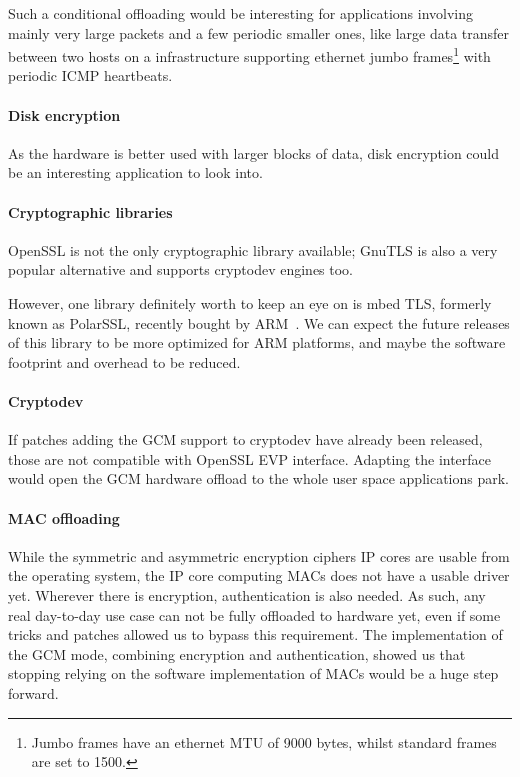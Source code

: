 Such a conditional offloading would be interesting for applications involving mainly very large packets and a few periodic smaller ones, like large data transfer between two hosts on a infrastructure supporting ethernet jumbo frames\footnote{Jumbo frames have an ethernet MTU of 9000 bytes, whilst standard frames are set to 1500.} with periodic ICMP heartbeats.

\paragraph{Disk encryption}
As the hardware is better used with larger blocks of data, disk encryption could be an interesting application to look into.

\paragraph{Cryptographic libraries}
OpenSSL is not the only cryptographic library available; GnuTLS is also a very popular alternative and supports cryptodev engines too.

However, one library definitely worth to keep an eye on is mbed TLS, formerly known as PolarSSL, recently bought by ARM~\cite{2015-arm-buy-polarssl}.
We can expect the future releases of this library to be more optimized for ARM platforms, and maybe the software footprint and overhead to be reduced.


\paragraph{Cryptodev}
If patches adding the GCM support to cryptodev have already been released, those are not compatible with OpenSSL EVP interface.
Adapting the interface would open the GCM hardware offload to the whole user space applications park.

\paragraph{MAC offloading}
While the symmetric and asymmetric encryption ciphers IP cores are usable from the operating system, the IP core computing MACs does not have a usable driver yet.
Wherever there is encryption, authentication is also needed.
As such, any real day-to-day use case can not be fully offloaded to hardware yet, even if some tricks and patches allowed us to bypass this requirement.
The implementation of the GCM mode, combining encryption and authentication, showed us that stopping relying on the software implementation of MACs would be a huge step forward.





